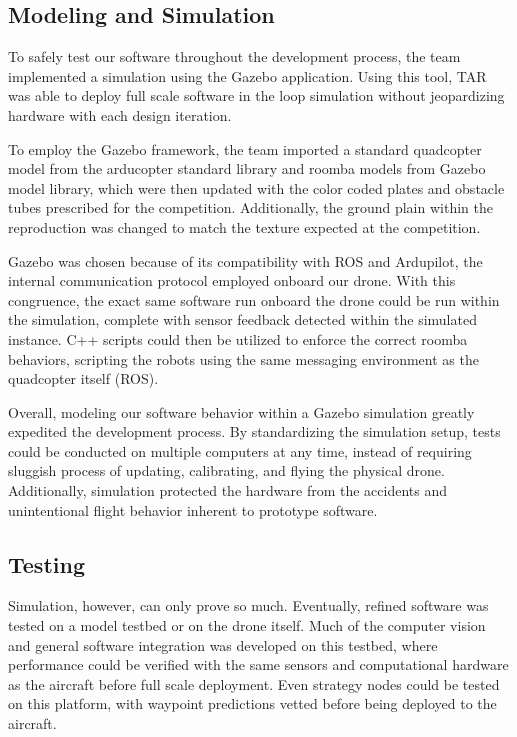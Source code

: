 \documentclass[12pt,letterpaper]{article}
\begin{document}
	\subsection*{Modeling and Simulation}

		To safely test our software throughout the development process, the team implemented a simulation using the Gazebo application. Using this tool, TAR was able to deploy full scale software in the loop simulation without jeopardizing hardware with each design iteration.

		To employ the Gazebo framework, the team imported a standard quadcopter model from the arducopter standard library and roomba models from Gazebo model library, which were then updated with the color coded plates and obstacle tubes prescribed for the competition. Additionally, the ground plain within the reproduction was changed to match the texture expected at the competition.

		Gazebo was chosen because of its compatibility with ROS and Ardupilot, the internal communication protocol employed onboard our drone. With this congruence, the exact same software run onboard the drone could be run within the simulation, complete with sensor feedback detected within the simulated instance. C++ scripts could then be utilized to enforce the correct roomba behaviors, scripting the robots using the same messaging environment as the quadcopter itself (ROS).

		Overall, modeling our software behavior within a Gazebo simulation greatly expedited the development process. By standardizing the simulation setup, tests could be conducted on multiple computers at any time, instead of requiring sluggish process of updating, calibrating, and flying the physical drone. Additionally, simulation protected the hardware from the accidents and unintentional flight behavior inherent to prototype software.


	\subsection*{Testing}
		Simulation, however, can only prove so much. Eventually, refined software was tested on a model testbed or on the drone itself. Much of the computer vision and general software integration was developed on this testbed, where performance could be verified with the same sensors and computational hardware as the aircraft before full scale deployment. Even strategy nodes could be tested on this platform, with waypoint predictions vetted before being deployed to the aircraft.
\end{document}
